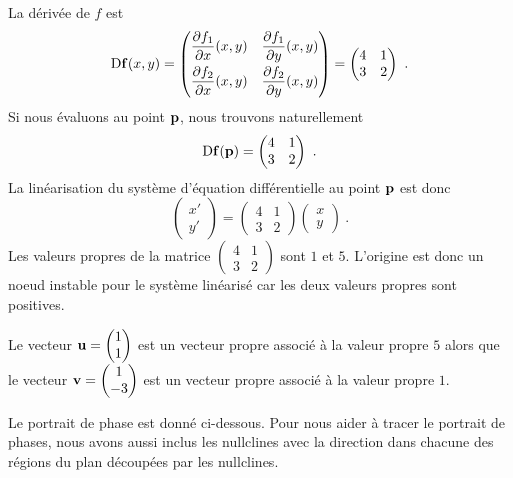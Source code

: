 { La dérivée de $f$ est
\[
\mathrm{D} \mathbf{f}(x,y) =
\begin{pmatrix}
\displaystyle \frac{\partial f_1}{\partial x}(x,y) & \displaystyle \frac{\partial f_1}{\partial y}(x,y) \\[0.8em]
\displaystyle \frac{\partial f_2}{\partial x}(x,y) & \displaystyle \frac{\partial f_2}{\partial y}(x,y)
\end{pmatrix}
= \begin{pmatrix} 4 & 1 \\ 3 & 2 \end{pmatrix} \ .
\]
Si nous évaluons au point $\mathbf{p}$, nous trouvons naturellement
\[
  \mathrm{D} \mathbf{f}(\mathbf{p}) =
  \begin{pmatrix} 4 & 1 \\ 3 & 2 \end{pmatrix} \ .
\]
La linéarisation du système d'équation différentielle au point
$\mathbf{p}$ est donc
\[
\begin{pmatrix} x' \\ y' \end{pmatrix} =
\begin{pmatrix} 4 & 1 \\ 3 & 2 \end{pmatrix}
\begin{pmatrix} x \\ y \end{pmatrix} \ .
\]
Les valeurs propres de la matrice 
$\displaystyle \begin{pmatrix} 4 & 1 \\ 3 & 2 \end{pmatrix}$
sont $1$ et $5$.  L'origine est donc un noeud instable pour le système
linéarisé car les deux valeurs propres sont positives.

Le vecteur $\displaystyle \mathbf{u} = \begin{pmatrix} 1 \\ 1 \end{pmatrix}$
est un vecteur propre associé à la valeur propre $5$ alors que le
vecteur $\displaystyle \mathbf{v} = \begin{pmatrix} 1 \\ -3 \end{pmatrix}$ est un
vecteur propre associé à la valeur propre $1$.

 Le portrait de phase est donné ci-dessous.
Pour nous aider à tracer le portrait de phases, nous avons aussi
inclus les nullclines avec la direction dans chacune des régions
du plan découpées par les nullclines.
}

